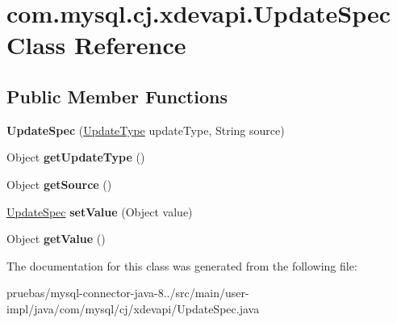 \hypertarget{classcom_1_1mysql_1_1cj_1_1xdevapi_1_1_update_spec}{}\section{com.\+mysql.\+cj.\+xdevapi.\+Update\+Spec Class Reference}
\label{classcom_1_1mysql_1_1cj_1_1xdevapi_1_1_update_spec}
\subsection*{Public Member Functions}
\begin{DoxyCompactItemize}
\item 
\mbox{\label{classcom_1_1mysql_1_1cj_1_1xdevapi_1_1_update_spec_ac481cb6f44ccba4764978830a608302d}} 
{\bfseries Update\+Spec} (\mbox{\hyperlink{enumcom_1_1mysql_1_1cj_1_1xdevapi_1_1_update_type}{Update\+Type}} update\+Type, String source)
\item 
\mbox{\label{classcom_1_1mysql_1_1cj_1_1xdevapi_1_1_update_spec_ad8b4b729a65bca6b5604b1cf7cbca626}} 
Object {\bfseries get\+Update\+Type} ()
\item 
\mbox{\label{classcom_1_1mysql_1_1cj_1_1xdevapi_1_1_update_spec_a09578e6d12432259c45c18d6b02acde8}} 
Object {\bfseries get\+Source} ()
\item 
\mbox{\label{classcom_1_1mysql_1_1cj_1_1xdevapi_1_1_update_spec_a277cb0b37a9c3329c25b65c2904f069c}} 
\mbox{\hyperlink{classcom_1_1mysql_1_1cj_1_1xdevapi_1_1_update_spec}{Update\+Spec}} {\bfseries set\+Value} (Object value)
\item 
\mbox{\label{classcom_1_1mysql_1_1cj_1_1xdevapi_1_1_update_spec_afc7fc71a9819d5dcf30bfe70b7faf515}} 
Object {\bfseries get\+Value} ()
\end{DoxyCompactItemize}


The documentation for this class was generated from the following file\+:\begin{DoxyCompactItemize}
\item 
pruebas/mysql-\/connector-\/java-\/8../src/main/user-\/impl/java/com/mysql/cj/xdevapi/Update\+Spec.\+java\end{DoxyCompactItemize}
